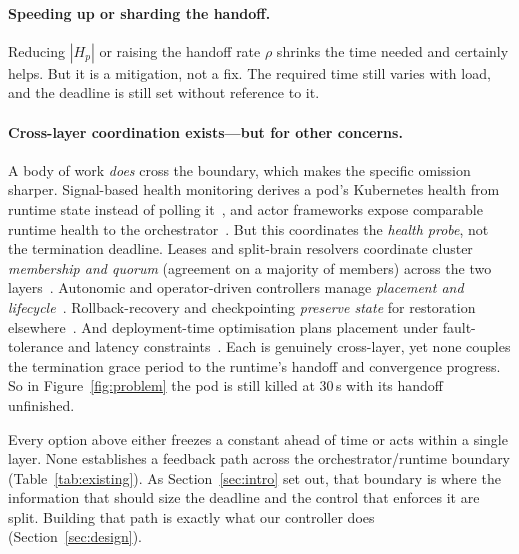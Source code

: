 \documentclass[AMA,Times1COL]{WileyNJDv5}
\begin{document}
\paragraph{Speeding up or sharding the handoff.} Reducing $|H_p|$ or raising the handoff rate $\rho$
shrinks the time needed and certainly helps. But it is a mitigation, not a fix. The required time
still varies with load, and the deadline is still set without reference to it.

\paragraph{Cross-layer coordination exists---but for other concerns.} A body of work \emph{does} cross
the boundary, which makes the specific omission sharper. Signal-based health monitoring derives a
pod's Kubernetes health from runtime state instead of polling it~\cite{roberts2025}, and actor
frameworks expose comparable runtime health to the orchestrator~\cite{akkaHealth}. But this
coordinates the \emph{health probe}, not the termination deadline. Leases and split-brain resolvers
coordinate cluster \emph{membership and quorum} (agreement on a majority of members) across the two
layers~\cite{akkaLease,akkaSBR}. Autonomic and operator-driven controllers manage \emph{placement and
lifecycle}~\cite{kephart2003, meliani2025proactive}. Rollback-recovery and checkpointing \emph{preserve
state} for restoration elsewhere~\cite{elnozahy2002}. And deployment-time optimisation plans placement
under fault-tolerance and latency constraints~\cite{ucc23,gustafsson2025rtilience}. Each is genuinely
cross-layer, yet none couples the termination grace period to the runtime's handoff and convergence
progress. So in Figure~\ref{fig:problem} the pod is still killed at 30\,s with its handoff unfinished.

\medskip\noindent
Every option above either freezes a constant ahead of time or acts within a single layer. None
establishes a feedback path across the orchestrator/runtime boundary (Table~\ref{tab:existing}). As
Section~\ref{sec:intro} set out, that boundary is where the information that should size the deadline
and the control that enforces it are split. Building that path is exactly what our controller does
(Section~\ref{sec:design}).
\end{document}
